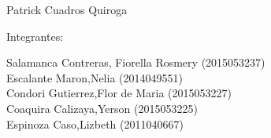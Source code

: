 \documentclass[12pt]{article}
\begin{document}
\begin{titlepage}
\begin{center}
\vspace*{0.1in}
\begin{large}
 Patrick Cuadros Quiroga\\
\end{large}

\vspace*{0.2in}
\vspace*{0.1in}
\begin{large}
Integrantes: \\
\begin{flushleft}
Salamanca Contreras, Fiorella Rosmery		\hfill	(2015053237) \\
Escalante Maron,Nelia 		\hfill	(2014049551) \\
Condori Gutierrez,Flor de Maria            	\hfill	(2015053227) \\
Coaquira Calizaya,Yerson     	\hfill	(2015053225) \\
Espinoza Caso,Lizbeth   		\hfill	(2011040667) \\

\end{flushleft}
\end{large}
\end{center}

\end{titlepage}
\end{document}
